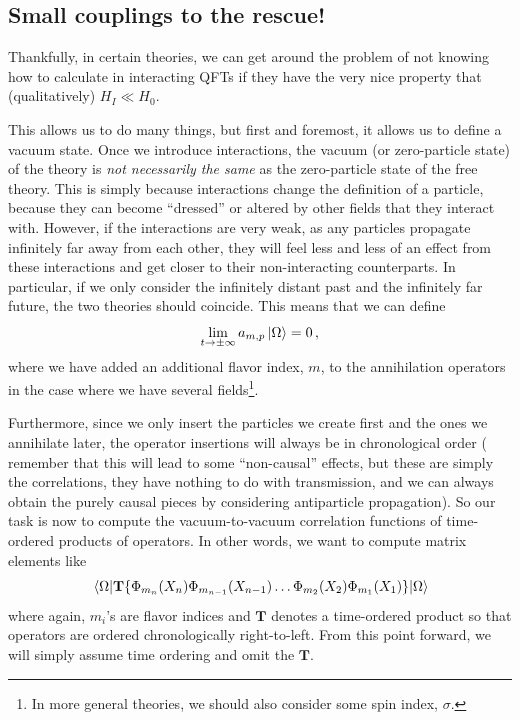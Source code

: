 \documentclass{article}
\numberwithin{equation}{subsection}
\begin{document}
\subsection{Small couplings to the rescue!}

Thankfully, in certain theories, we can get around the problem of not knowing how to calculate in interacting QFTs if they have the very nice property that (qualitatively) $H_I\ll H_0$.

This allows us to do many things, but first and foremost, it allows us to define a vacuum state. Once we introduce interactions, the vacuum (or zero-particle state) 
of the theory is \textit{not necessarily the same} as the zero-particle state of the free theory. This is simply because interactions change the definition of a particle, because they 
can become ``dressed'' or altered by other fields that they interact with. However, if the interactions are very weak, as any particles propagate infinitely far away from each other, they 
will feel less and less of an effect from these interactions and get closer to their non-interacting counterparts. In particular, if we only consider the infinitely distant past and the 
infinitely far future, the two theories should coincide. This means that we can define
\begin{equation}
    \lim_{t\to\pm\infty}a_{m,p}\ket{\Omega} = 0\,,
\end{equation}
where we have added an additional flavor index, $m$, to the annihilation operators in the case where we have several fields\footnote{In more general theories, 
we should also consider some spin index, $\sigma$.}.

Furthermore, since we only insert the particles we create first and the ones we annihilate later, the operator insertions will always be in chronological order (
remember that this will lead to some ``non-causal'' effects, but these are simply the correlations, they have nothing to do with transmission, and we can always obtain the purely 
causal pieces by considering antiparticle propagation). So our task is now to compute the vacuum-to-vacuum correlation functions of time-ordered products of operators. In other words, 
we want to compute matrix elements like
\begin{equation}\label{eq:TOprod}
    \mel{\Omega}{\mathbf{T}\{\Phi_{m_n}(X_n)\Phi_{m_{n-1}}(X_{n-1})\dots\Phi_{m_2}(X_2)\Phi_{m_1}(X_1)\}}{\Omega}
\end{equation}
where again, $m_i$'s are flavor indices and $\mathbf{T}$ denotes a time-ordered product so that operators are ordered chronologically right-to-left. From this point forward, 
we will simply assume time ordering and omit the $\mathbf{T}$.
\end{document}
